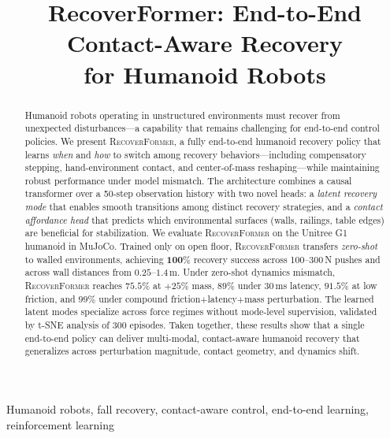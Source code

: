 \documentclass[conference,letterpaper]{IEEEtran}
\newcommand{\methodname}{\textsc{RecoverFormer}}
\begin{document}
\title{RecoverFormer: End-to-End Contact-Aware Recovery\\ for Humanoid Robots}

\author{
}

\maketitle

\begin{abstract}
Humanoid robots operating in unstructured environments must recover from unexpected disturbances---a capability that remains challenging for end-to-end control policies.
We present \methodname{}, a fully end-to-end humanoid recovery policy that learns \emph{when} and \emph{how} to switch among recovery behaviors---including compensatory stepping, hand-environment contact, and center-of-mass reshaping---while maintaining robust performance under model mismatch.
The architecture combines a causal transformer over a 50-step observation history with two novel heads: a \emph{latent recovery mode} that enables smooth transitions among distinct recovery strategies, and a \emph{contact affordance head} that predicts which environmental surfaces (walls, railings, table edges) are beneficial for stabilization.
We evaluate \methodname{} on the Unitree G1 humanoid in MuJoCo.
Trained only on open floor, \methodname{} transfers \emph{zero-shot} to walled environments, achieving $\mathbf{100\%}$ recovery success across 100--300\,N pushes and across wall distances from $0.25$--$1.4$\,m.
Under zero-shot dynamics mismatch, \methodname{} reaches $75.5\%$ at $+25\%$ mass, $89\%$ under $30$\,ms latency, $91.5\%$ at low friction, and $99\%$ under compound friction$+$latency$+$mass perturbation.
The learned latent modes specialize across force regimes without mode-level supervision, validated by t-SNE analysis of 300 episodes.
Taken together, these results show that a single end-to-end policy can deliver multi-modal, contact-aware humanoid recovery that generalizes across perturbation magnitude, contact geometry, and dynamics shift.
\end{abstract}

\begin{IEEEkeywords}
Humanoid robots, fall recovery, contact-aware control, end-to-end learning, reinforcement learning
\end{IEEEkeywords}
\end{document}
